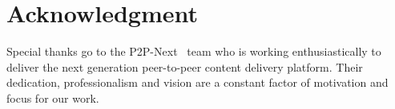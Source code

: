 \documentclass[conference]{IEEEtran}
\begin{document}
\section*{Acknowledgment}
\label{sec:acknowledgment}

Special thanks go to the P2P-Next~\cite{p2p-next} team who is working
enthusiastically to deliver the next generation peer-to-peer content delivery
platform. Their dedication, professionalism and vision are a constant factor
of motivation and focus for our work.



\end{document}

